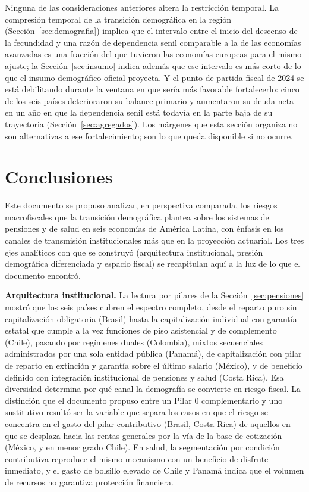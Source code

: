 \documentclass[12pt, letterpaper]{article}
\begin{document}
Ninguna de las consideraciones anteriores altera la restricción temporal. La
compresión temporal de la transición demográfica en la región
(Sección~\ref{sec:demografia}) implica que el intervalo entre el inicio del
descenso de la fecundidad y una razón de dependencia senil comparable a la de las
economías avanzadas es una fracción del que tuvieron las economías europeas para
el mismo ajuste; la Sección~\ref{sec:insumo} indica además que ese intervalo es
más corto de lo que el insumo demográfico oficial proyecta. Y el punto de partida
fiscal de 2024 se está debilitando durante la ventana en que sería más favorable
fortalecerlo: cinco de los seis países deterioraron su balance
primario y aumentaron su deuda neta en un año en que la dependencia senil está
todavía en la parte baja de su trayectoria (Sección~\ref{sec:agregados}). Los
márgenes que esta sección organiza no son alternativas a ese fortalecimiento; son
lo que queda disponible si no ocurre.

\newpage
\section{Conclusiones}
\label{sec:conclusiones}

Este documento se propuso analizar, en perspectiva comparada, los riesgos
macrofiscales que la transición demográfica plantea sobre los sistemas de
pensiones y de salud en seis economías de América Latina, con énfasis en los
canales de transmisión institucionales más que en la proyección actuarial. Los
tres ejes analíticos con que se construyó (arquitectura institucional, presión
demográfica diferenciada y espacio fiscal) se recapitulan aquí a la luz de lo que
el documento encontró.

\textbf{Arquitectura institucional.} La lectura por pilares de la
Sección~\ref{sec:pensiones} mostró que los seis países cubren el espectro completo,
desde el reparto puro sin capitalización obligatoria (Brasil) hasta la
capitalización individual con garantía estatal que cumple a la vez funciones de
piso asistencial y de complemento (Chile), pasando por regímenes duales (Colombia),
mixtos secuenciales administrados por una sola entidad pública (Panamá), de
capitalización con pilar de reparto en extinción y garantía sobre el último
salario (México), y de beneficio definido con integración institucional de
pensiones y salud (Costa Rica). Esa diversidad determina por qué canal la
demografía se convierte en riesgo fiscal. La distinción que el documento
propuso entre un Pilar 0 complementario y uno sustitutivo resultó ser la variable
que separa los casos en que el riesgo se concentra en el gasto del pilar
contributivo (Brasil, Costa Rica) de aquellos en que se desplaza hacia las rentas
generales por la vía de la base de cotización (México, y en menor grado Chile). En
salud, la segmentación por condición contributiva reproduce el mismo mecanismo con
un beneficio de disfrute inmediato, y el gasto de bolsillo elevado de Chile y
Panamá indica que el volumen de recursos no garantiza protección financiera.
\end{document}
